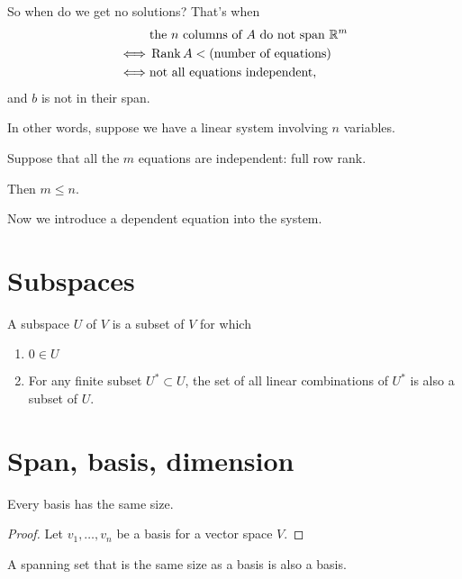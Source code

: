 So when do we get no solutions? That's when
\begin{align*}
  &\text{the $n$ columns of $A$ do not span $\mathbb{R}^m$}\\
  \iff &\operatorname{\mathrm{Rank}} A < \text{(number of equations)}\\
  \iff &\text{not all equations independent},
\end{align*}
and $b$ is not in their span.

In other words, suppose we have a linear system involving $n$ variables.

Suppose that all the $m$ equations are independent: full row rank.

Then $m \leq n$.

Now we introduce a dependent equation into the system.



\section{Subspaces}
A subspace $U$ of $V$ is a subset of $V$ for which
\begin{enumerate}
\item $0 \in U$
\item For any finite subset $U^* \subset U$, the set of all linear combinations
  of $U^*$ is also a subset of $U$.
\end{enumerate}

\section{Span, basis, dimension}
\begin{theorem}
  Every basis has the same size.
\end{theorem}

\begin{proof} Let $v_1, \ldots, v_n$ be a basis for a vector space $V$.


\end{proof}

\begin{theorem}
  A spanning set that is the same size as a basis is also a basis.
\end{theorem}

